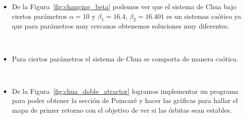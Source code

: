 \begin{frame}
	\frametitle{\secname}
	\begin{itemize}
		\item De la Figura~\ref{fig:changing_beta} podemos ver que el sistema de Chua bajo ciertos parámetros $\alpha=10$  y $\beta_{1}=16.4$, $\beta_{2}=16.401$ es un sistemas caótico ya que para parámetros muy cercanos obtenemos soluciones muy diferentes.

		      \

		\item Para ciertos parámetros el sistema de Chua se comporta de manera caótica.

		      \


		\item De la Figura~\ref{fig:chua_doble_atractor} logramos implementar un programa para poder obtener la sección de Poincaré y hacer las gráficas para hallar el mapa de primer retorno con el objetivo de ver si las órbitas sean estables. %
	\end{itemize}
\end{frame}
